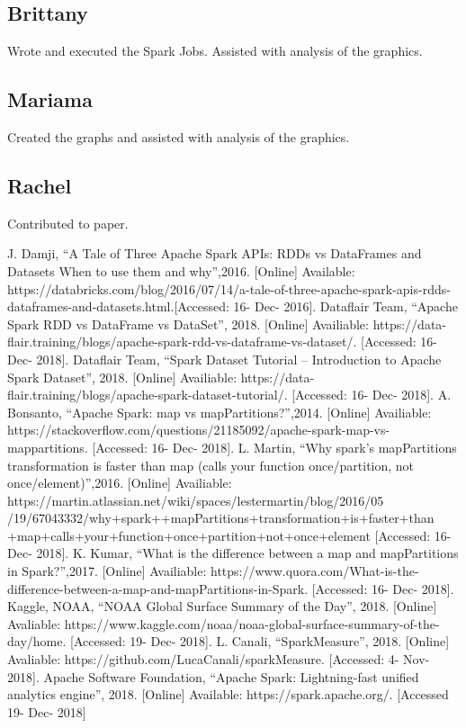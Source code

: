 \documentclass[conference]{IEEEtran}
\begin{document}
\subsection{Brittany} Wrote and executed the Spark Jobs.  Assisted with analysis of the graphics.
\subsection{Mariama} Created the graphs and assisted with analysis of the graphics.
\subsection{Rachel} Contributed to paper.

\begin{thebibliography}{00}
 J. Damji, ``A Tale of Three Apache Spark APIs: RDDs vs DataFrames and Datasets
When to use them and why'',2016. [Online] Available: https://databricks.com/blog/2016/07/14/a-tale-of-three-apache-spark-apis-rdds-dataframes-and-datasets.html.[Accessed: 16- Dec- 2016].
 Dataflair Team, ``Apache Spark RDD vs DataFrame vs DataSet'', 2018. [Online] Availiable: https://data-flair.training/blogs/apache-spark-rdd-vs-dataframe-vs-dataset/. [Accessed: 16- Dec- 2018].
 Dataflair Team, ``Spark Dataset Tutorial – Introduction to Apache Spark Dataset'', 2018. [Online] Availiable: https://data-flair.training/blogs/apache-spark-dataset-tutorial/. [Accessed: 16- Dec- 2018].
 A. Bonsanto, ``Apache Spark: map vs mapPartitions?'',2014. [Online] Availiable: https://stackoverflow.com/questions/21185092/apache-spark-map-vs-mappartitions. [Accessed: 16- Dec- 2018].
 L. Martin, ``Why spark's mapPartitions transformation is 
faster than map (calls your function once/partition, not once/element)'',2016. [Online] Availiable: https://martin.atlassian.net/wiki/spaces/lestermartin/blog/2016/05
/19/67043332/why+spark++mapPartitions+transformation+is+faster+than
+map+calls+your+function+once+partition+not+once+element [Accessed: 16- Dec- 2018].
 K. Kumar, ``What is the difference between a map and mapPartitions in Spark?'',2017. [Online] Availiable: https://www.quora.com/What-is-the-difference-between-a-map-and-mapPartitions-in-Spark. [Accessed: 16- Dec- 2018].
 Kaggle, NOAA, ``NOAA Global Surface Summary of the Day'', 2018. [Online] Avaliable: 
https://www.kaggle.com/noaa/noaa-global-surface-summary-of-the-day/home. [Accessed: 19- Dec- 2018].
 L. Canali, ``SparkMeasure'', 2018. [Online] Avaliable: https://github.com/LucaCanali/sparkMeasure. [Accessed: 4- Nov- 2018].
 Apache Software Foundation, ``Apache Spark: Lightning-fast unified analytics engine'', 2018. [Online] Available: https://spark.apache.org/. [Accessed 19- Dec- 2018]
\end{thebibliography}
\vspace{12pt}
\end{document}
